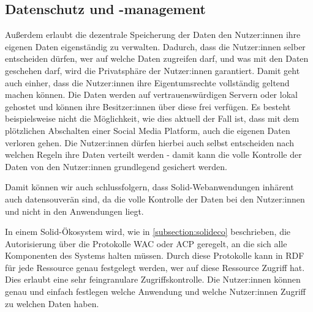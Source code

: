 \documentclass[acmtog]{acmart}
\begin{document}
\subsection{Datenschutz und -management} \label{subsection:vorteile:daten} 

Außerdem erlaubt die dezentrale Speicherung der Daten den Nutzer:innen ihre eigenen Daten eigenständig zu verwalten. Dadurch, dass die Nutzer:innen selber entscheiden dürfen, wer auf welche Daten zugreifen darf, und was mit den Daten geschehen darf, wird die Privatsphäre der Nutzer:innen garantiert. Damit geht auch einher, dass die Nutzer:innen ihre Eigentumsrechte vollständig geltend machen können. Die Daten werden auf vertrauenswürdigen Servern oder lokal gehostet und können ihre Besitzer:innen über diese frei verfügen. Es besteht beispielsweise nicht die Möglichkeit, wie dies aktuell der Fall ist, dass mit dem plötzlichen Abschalten einer Social Media Platform, auch die eigenen Daten verloren gehen. Die Nutzer:innen dürfen hierbei auch selbst entscheiden nach welchen Regeln ihre Daten verteilt werden - damit kann die volle Kontrolle der Daten von den Nutzer:innen grundlegend gesichert werden. \cite{yeung2023decentralization}

Damit können wir auch schlussfolgern, dass Solid-Webanwendungen inhärent auch datensouverän sind, da die volle Kontrolle der Daten bei den Nutzer:innen und nicht in den Anwendungen liegt.

In einem Solid-Ökosystem wird, wie in \ref{subsection:solideco} beschrieben, die Autorisierung über die Protokolle WAC oder ACP geregelt, an die sich alle Komponenten des Systems halten müssen. Durch diese Protokolle kann in RDF für jede Ressource genau festgelegt werden, wer auf diese Ressource Zugriff hat. Dies erlaubt eine sehr feingranulare Zugriffskontrolle. Die Nutzer:innen können genau und einfach festlegen welche Anwendung und welche Nutzer:innen Zugriff zu welchen Daten haben.
\end{document}
